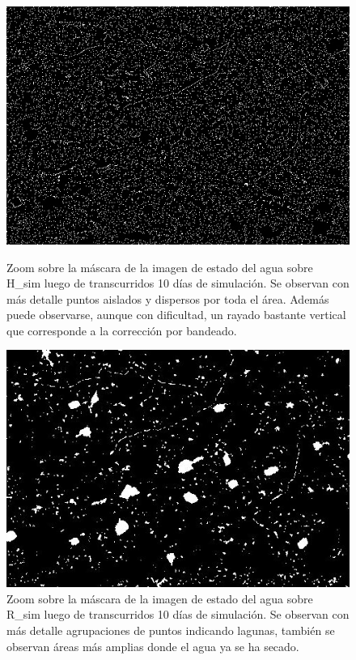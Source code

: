 \documentclass[10pt,a4paper, twoside]{report}
\begin{document}
 
\begin{figure}[!htb]
   \begin{minipage}{0.48\textwidth}
			\centering
			\includegraphics[width=1.0\linewidth]{imagenes/HSHEDSGlobalZoom.jpg}
			\caption{Zoom sobre la máscara de la imagen de estado del agua sobre H\_sim luego de transcurridos 10 días de simulación. Se observan con más detalle puntos aislados y dispersos por toda el área. Además puede observarse, aunque con dificultad, un rayado bastante vertical que corresponde a la corrección por bandeado.}
			\label{HSHEDSGlobalZoom}
   \end{minipage}\hfill
   \begin {minipage}{0.48\textwidth}
			\centering
			\includegraphics[width=1.0\linewidth]{imagenes/DEMCRGlobalZoom.jpg}
			\caption{Zoom sobre la máscara de la imagen de estado del agua sobre R\_sim luego de transcurridos 10 días de simulación. Se observan con más detalle agrupaciones de puntos indicando lagunas, también se observan áreas más amplias donde el agua ya se ha secado.}
			\label{DEMCRGlobalZoom}
   \end{minipage}
\end{figure}
\end{document}
